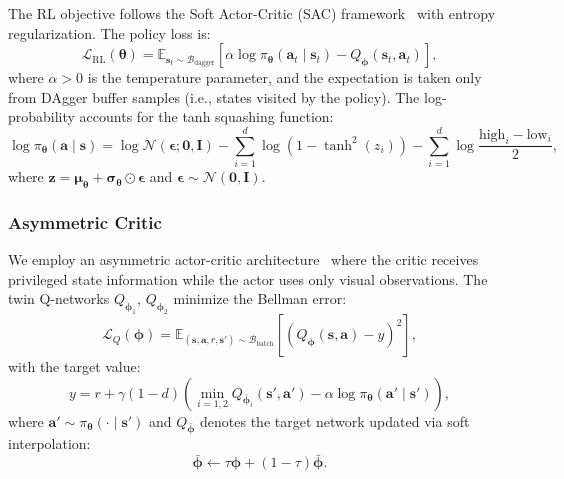 The RL objective follows the Soft Actor-Critic (SAC) framework~\cite{haarnoja2018soft} with entropy regularization. The policy loss is:
\begin{equation}
\mathcal{L}_{\text{RL}}(\boldsymbol{\theta}) = \mathbb{E}_{\mathbf{s}_t \sim \mathcal{B}_{\text{dagger}}} \left[ \alpha \log \pi_{\boldsymbol{\theta}}(\mathbf{a}_t \mid \mathbf{s}_t) - Q_{\boldsymbol{\phi}}(\mathbf{s}_t, \mathbf{a}_t) \right],
\label{eq:rl_loss}
\end{equation}
where $\alpha > 0$ is the temperature parameter, and the expectation is taken only from DAgger buffer samples (i.e., states visited by the policy). The log-probability accounts for the tanh squashing function:
\begin{equation}
\log \pi_{\boldsymbol{\theta}}(\mathbf{a} \mid \mathbf{s}) = \log \mathcal{N}(\boldsymbol{\epsilon}; \mathbf{0}, \mathbf{I}) - \sum_{i=1}^{d} \log(1 - \tanh^2(z_i)) - \sum_{i=1}^{d} \log \frac{\text{high}_i - \text{low}_i}{2},
\label{eq:logprob}
\end{equation}
where $\mathbf{z} = \boldsymbol{\mu}_{\boldsymbol{\theta}} + \boldsymbol{\sigma}_{\boldsymbol{\theta}} \odot \boldsymbol{\epsilon}$ and $\boldsymbol{\epsilon} \sim \mathcal{N}(\mathbf{0}, \mathbf{I})$.

\subsubsection{Asymmetric Critic}

We employ an asymmetric actor-critic architecture~\cite{pinto2017asymmetric} where the critic receives privileged state information while the actor uses only visual observations. The twin Q-networks $Q_{\boldsymbol{\phi}_1}$, $Q_{\boldsymbol{\phi}_2}$ minimize the Bellman error:
\begin{equation}
\mathcal{L}_Q(\boldsymbol{\phi}) = \mathbb{E}_{(\mathbf{s}, \mathbf{a}, r, \mathbf{s}') \sim \mathcal{B}_{\text{batch}}} \left[ \left( Q_{\boldsymbol{\phi}}(\mathbf{s}, \mathbf{a}) - y \right)^2 \right],
\label{eq:critic_loss}
\end{equation}
with the target value:
\begin{equation}
y = r + \gamma (1 - d) \left( \min_{i=1,2} Q_{\bar{\boldsymbol{\phi}}_i}(\mathbf{s}', \mathbf{a}') - \alpha \log \pi_{\boldsymbol{\theta}}(\mathbf{a}' \mid \mathbf{s}') \right),
\label{eq:target}
\end{equation}
where $\mathbf{a}' \sim \pi_{\boldsymbol{\theta}}(\cdot \mid \mathbf{s}')$ and $Q_{\bar{\boldsymbol{\phi}}}$ denotes the target network updated via soft interpolation:
\begin{equation}
\bar{\boldsymbol{\phi}} \leftarrow \tau \boldsymbol{\phi} + (1 - \tau) \bar{\boldsymbol{\phi}}.
\label{eq:soft_update}
\end{equation}

